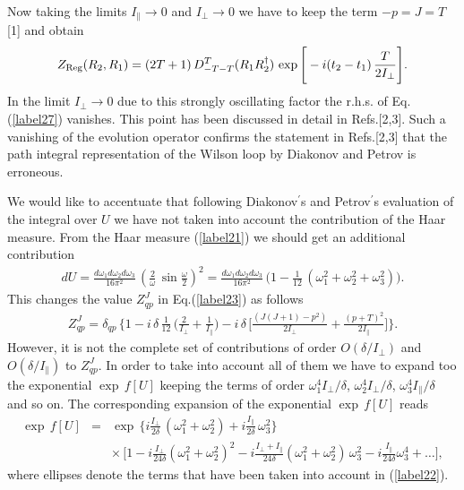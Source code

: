 \documentclass[a4paper,11pt]{article}
\begin{document}
Now taking the limits $I_{\parallel} \to 0$ and $I_{\perp} \to 0$ we
have to keep the term $-p = J = T$ [1] and obtain
%
\begin{eqnarray}\label{label27}
Z_{\rm Reg} (R_2, R_1) =
(2T+1)\,D^T_{-T-T}(R_1R^{\dagger}_2)\,\exp\Bigg[ -i(t_2-t_1)\,\frac{T}{2
I_{\perp}}\Bigg].
\end{eqnarray}
%
In the limit $I_{\perp} \to 0$ due to this strongly oscillating factor
the r.h.s. of Eq.(\ref{label27}) vanishes. This point has been
discussed in detail in Refs.[2,3]. Such a vanishing of the evolution
operator confirms the statement in Refs.[2,3] that the path integral
representation of the Wilson loop by Diakonov and Petrov is
erroneous.

We would like to accentuate that following Diakonov$^{\prime}$s and
Petrov$^{\prime}$s evaluation of the integral over $U$ we have not
taken into account the contribution of the Haar measure. From the Haar
measure (\ref{label21}) we should get an additional contribution
%
\begin{eqnarray}\label{label28}
dU =
\frac{d\omega_1d\omega_2d\omega_3}{16\pi^2}\,
\left(\frac{2}{\omega}\,\sin\frac{\omega}{2}\right)^2
= \frac{d\omega_1d\omega_2d\omega_3}{16\pi^2}\,\Big( 1 -
\frac{1}{12}\,(\omega^2_1 + \omega^2_2 + \omega^2_3)\Big).
\end{eqnarray}
%
This changes the value $Z^J_{qp}$ in Eq.(\ref{label23}) as follows
%
\begin{eqnarray}\label{label29}
Z^J_{qp} = \delta_{qp}\,\Bigg\{1
-i\,\delta\,\frac{1}{12}\,\Bigg(\frac{2}{I_{\perp}}+
\frac{1}{I_{\parallel}}\Bigg) - i\,\delta\,\Bigg[\frac{(J(J+1) -
p^2)}{2I_{\perp}} + \frac{(p + T)^2}{2I_{\parallel}}\Bigg]\Bigg\}.
\end{eqnarray}
%
However, it is not the complete set of contributions of order
$O(\delta/I_{\perp})$ and $O(\delta/I_{\parallel})$ to $Z^J_{qp}$. In
order to take into account all of them we have to expand too the
exponential $\exp\,f[U]$ keeping the terms of order
$\omega^4_1I_{\perp}/\delta$, $\omega^4_2I_{\perp}/\delta$,
$\omega^4_3I_{\parallel}/\delta$ and so on.  The corresponding expansion
of the exponential $\exp\,f[U]$ reads
%
\begin{eqnarray}\label{label30}
\exp\,f[U] &=& \exp\, \Bigg\{i\frac{I_{\perp}}{2\delta}\,(\omega^2_1 +
\omega^2_2) +
i\frac{I_{\parallel}}{2\delta}\,\omega^2_3\Bigg\}\nonumber\\
&&\times\,\Bigg[1 - i\frac{I_{\perp}}{24\delta}(\omega^2_1 +
\omega^2_2)^2 - i\frac{I_{\perp} + I_{\parallel}}{24\delta}(\omega^2_1
+ \omega^2_2)\,\omega^2_3 - i\frac{I_{\parallel}}{24\delta}\omega^4_3
+\ldots\Bigg],
\end{eqnarray}
%
where ellipses denote the terms that have been taken into account in
(\ref{label22}).
\end{document}
